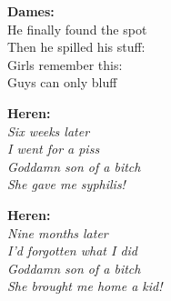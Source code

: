 \textbf{Dames:}\\
He finally found the spot\\
Then he spilled his stuff:\\
Girls remember this:\\
Guys can only bluff



\textbf{Heren:}\\
\textit{Six weeks later}\\
\textit{I went for a piss}\\
\textit{Goddamn son of a bitch}\\
\textit{She gave me syphilis!}

\textbf{Heren:}\\
\textit{Nine months later}\\
\textit{I'd forgotten what I did}\\
\textit{Goddamn son of a bitch}\\
\textit{She brought me home a kid!}
